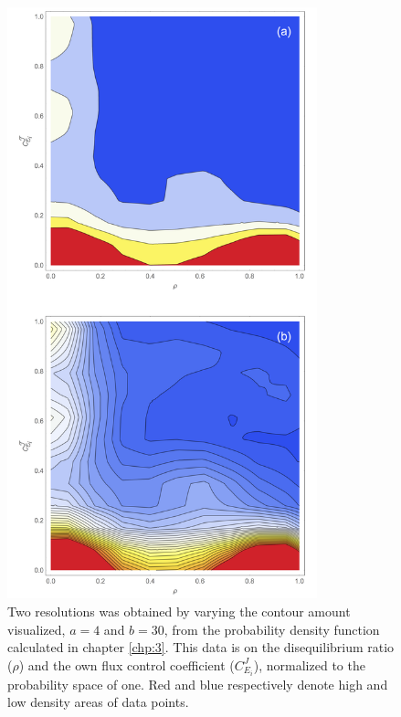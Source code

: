 \begin{figure}[p] \label{TwoResPDF}
\includegraphics[width=0.8\textwidth]{figs/TwoResPDF.png}
\centering
\caption{Two resolutions was obtained by varying the contour amount visualized, $a = 4$ and $b = 30$, from the probability density function calculated in chapter \ref{chp:3}. This data is on the disequilibrium ratio ($\rho$) and the own flux control coefficient ($C_{E_i}^J$), normalized to the probability space of one. Red and blue respectively denote high and low density areas of data points.}
\end{figure}

